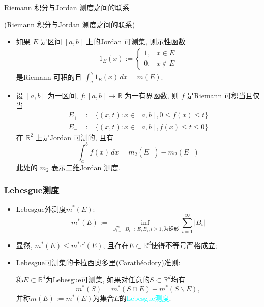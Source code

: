 \begin{frame}{{\rm Riemann }积分与{\rm Jordan} 测度之间的联系}
\begin{thm}({\rm Riemann }积分与{\rm Jordan} 测度之间的联系)
	\begin{itemize}
		\item  如果 $E$ 是区间 $[a,b]$ 上的{\rm Jordan} 可测集, 则示性函数
		\begin{align*}
			1_{E}(x):=\left\{\begin{array}{ll}
				1, & x\in E \\ 0, & x\notin E \end{array}\right.
		\end{align*}
		是{\rm Riemann } 可积的且 $\int_{a}^b{1}_{E}(x) \, dx=m(E)$.
		\item  设 $[a,b]$ 为一区间, $f:[a,b]\rightarrow \mathbb{R}$ 为一有界函数, 则 $f$ 是{\rm Riemann }可积当且仅当
		\begin{align}
			E_+ &:=\{(x,t):x\in[a,b], 0\leq f(x)\leq t\}\\ E_-&:=\{(x,t):x\in[a,b], f(x)\leq t\leq 0\}
		\end{align}
		在 $\mathbb{R}^2$ 上是{\rm Jordan} 可测的, 且有
		$$\int_{a}^b f(x)  \, dx=m_{2}(E_{+})-m_{2}(E_{-}) $$
		此处的 $m_{2}$ 表示二维{\rm Jordan}  测度.
	\end{itemize}

\end{thm}
\end{frame}




\begin{frame}
	\frametitle{{\rm Lebesgue}测度}

	\begin{itemize}[<+-|alert@+>]
		\item{\rm Lebesgue}外测度$m^*(E)$:
		\[m^*(E):=\inf_{\cup_{i=1}^\infty B_i\supset E, B_i, i\geq 1, \mbox{为矩形}}\sum_{i=1}^\infty |B_i|\]
		\item 显然, $m^*(E)\leq m^{*,J}(E)$, 且存在$E\subset\mathbb{R}^d$使得不等号严格成立;
		\item{\rm Lebesgue}可测集的卡拉西奥多里({\rm Carath{\'e}odory})准则:\pause
		\vspace{0.4cm}

		称$E\subset\mathbb{R}^d$为{\rm Lebesgue}可测集, 如果对任意的$S\subset\mathbb{R}^d$均有
		\[m^*(S)=m^*(S\cap E)+m^*(S\backslash E),\]
		并称$m(E):=m^*(E)$为集合$E$的\textcolor{cyan}{{\rm Lebesgue}测度}.
	\end{itemize}
\end{frame}

